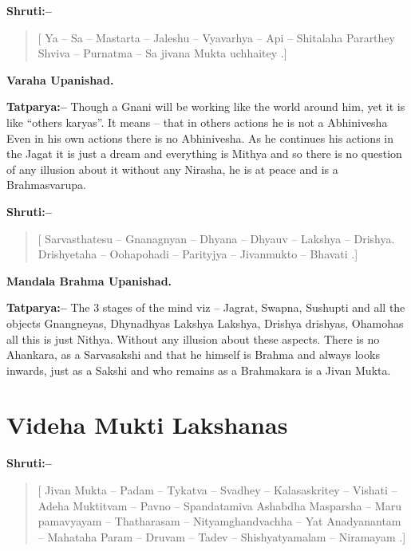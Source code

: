 \textbf{Shruti:–}

\begin{verse}
[ Ya – Sa – Mastarta – Jaleshu – Vyavarhya – Api – Shitalaha  Pararthey Shviva – Purnatma – Sa jivana Mukta uchhaitey .]
\end{verse}

\begin{flushright}
\textbf{Varaha Upanishad.}
\end{flushright}

\textbf{Tatparya:–} Though a Gnani will be working like the world around him, yet it is like “others karyas”. It means – that in others actions he is not a Abhinivesha Even in his own actions there is no Abhinivesha. As he continues his actions in the Jagat it is just a dream and everything is Mithya and so there is no question of any illusion about it without any Nirasha, he is at peace and is a Brahmasvarupa.

\textbf{Shruti:–}

\begin{verse}
[ Sarvasthatesu – Gnanagnyan – Dhyana – Dhyauv – Lakshya – Drishya. Drishyetaha – Oohapohadi – Parityjya – Jivanmukto – Bhavati .]
\end{verse}

\begin{flushright}
\textbf{Mandala Brahma Upanishad.}
\end{flushright}

\textbf{Tatparya:–} The 3 stages of the mind viz – Jagrat, Swapna, Sushupti and all the objects Gnangneyas, Dhynadhyas Lakshya Lakshya, Drishya drishyas, Ohamohas all this is just Nithya. Without any illusion about these aspects. There is no Ahankara, as a Sarvasakshi and that he himself is Brahma and always looks inwards, just as a Sakshi and who remains as a Brahmakara is a Jivan Mukta.

\chapter{Videha Mukti Lakshanas}

\textbf{Shruti:–}

\begin{verse}
[ Jivan Mukta – Padam – Tykatva – Svadhey – Kalasaskritey – Vishati – Adeha Muktitvam – Pavno – Spandatamiva  Ashabdha Masparsha – Maru pamavyayam – Thatharasam – Nityamghandvachha – Yat  Anadyanantam – Mahataha Param – Druvam – Tadev – Shishyatyamalam – Niramayam .]
\end{verse}

